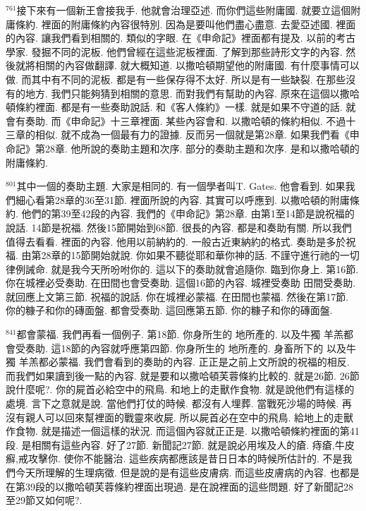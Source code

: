 \documentclass{book}
\begin{document}
$^{761}$接下來有一個新王會接我手.
他就會治理亞述.
而你們這些附庸國.
就要立這個附庸條約.
裡面的附庸條約內容很特別.
因為是要叫他們盡心盡意.
去愛亞述國.
裡面的內容.
讓我們看到相關的.
類似的字眼.
在《申命記》裡面都有提及.
以前的考古學家.
發掘不同的泥板.
他們曾經在這些泥板裡面.
了解到那些詩形文字的內容.
然後就將相關的內容做翻譯.
就大概知道.
以撒哈頓期望他的附庸國.
有什麼事情可以做.
而其中有不同的泥板.
都是有一些保存得不太好.
所以是有一些缺裂.
在那些沒有的地方.
我們只能夠猜到相關的意思.
而對我們有幫助的內容.
原來在這個以撒哈頓條約裡面.
都是有一些奏助說話.
和《客人條約》一樣.
就是如果不守道的話.
就會有奏助.
而《申命記》十三章裡面.
某些內容會和.
以撒哈頓的條約相似.
不過十三章的相似.
就不成為一個最有力的證據.
反而另一個就是第28章.
如果我們看《申命記》第28章.
他所說的奏助主題和次序.
部分的奏助主題和次序.
是和以撒哈頓的附庸條約.

$^{801}$其中一個的奏助主題.
大家是相同的.
有一個學者叫T. Gates.
他會看到.
如果我們細心看第28章的36至31節.
裡面所說的內容.
其實可以呼應到.
以撒哈頓的附庸條約.
他們的第39至42段的內容.
我們的《申命記》第28章.
由第1至14節是說祝福的說話.
14節是祝福.
然後15節開始到68節.
很長的內容.
都是和奏助有關.
所以我們值得去看看.
裡面的內容.
他用以前納約的.
一般古近東納約的格式.
奏助是多於祝福.
由第28章的15節開始就說.
你如果不聽從耶和華你神的話.
不謹守進行祂的一切律例誡命.
就是我今天所吩咐你的.
這以下的奏助就會追隨你.
臨到你身上.
第16節.
你在城裡必受奏助.
在田間也會受奏助.
這個16節的內容.
城裡受奏助 田間受奏助.
就回應上文第三節.
祝福的說話.
你在城裡必蒙福.
在田間也蒙福.
然後在第17節.
你的糠子和你的磚面盤.
都會受奏助.
這回應第五節.
你的糠子和你的磚面盤.

$^{841}$都會蒙福.
我們再看一個例子.
第18節.
你身所生的 地所產的.
以及牛獨 羊羔都會受奏助.
這18節的內容就呼應第四節.
你身所生的 地所產的.
身畜所下的 以及牛獨 羊羔都必蒙福.
我們會看到的奏助的內容.
正正是之前上文所說的祝福的相反.
而我們如果讀到後一點的內容.
就是要和以撒哈頓芙蓉條約比較的.
就是26節.
26節說什麼呢?.
你的屍首必給空中的飛鳥.
和地上的走獸作食物.
就是說他們有這樣的處境.
言下之意就是說.
當他們打仗的時候.
都沒有人埋葬.
當戰死沙場的時候.
再沒有親人可以回來幫裡面的戰靈來收屍.
所以屍首必在空中的飛鳥.
給地上的走獸作食物.
就是描述一個這樣的狀況.
而這個內容就正正是.
以撒哈頓條約裡面的第41段.
是相關有這些內容.
好了27節.
新聞記27節.
就是說必用埃及人的瘡.
痔瘡,牛皮癬,戒攻擊你.
使你不能醫治.
這些疾病都應該是昔日日本的時候所估計的.
不是我們今天所理解的生理病徵.
但是說的是有這些皮膚病.
而這些皮膚病的內容.
也都是在第39段的以撒哈頓芙蓉條約裡面出現過.
是在說裡面的這些問題.
好了新聞記28至29節又如何呢?.
\end{document}
